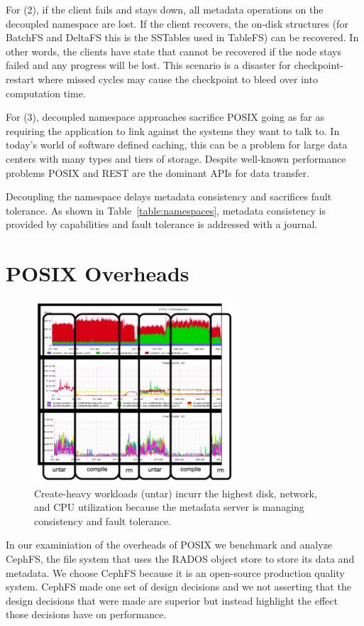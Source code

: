 \documentclass[preprint]{sigplanconf-eurosys}
\begin{document}
For (2), if the client fails and stays down, all metadata operations on the
decoupled namespace are lost. If the client recovers, the on-disk structures
(for BatchFS and DeltaFS this is the SSTables used in TableFS) can be
recovered. In other words, the clients have state that cannot be recovered if
the node stays failed and any progress will be lost. This scenario is a
disaster for checkpoint-restart where missed cycles may cause the checkpoint to
bleed over into computation time.

For (3), decoupled namespace approaches sacrifice POSIX going as far as
requiring the application to link against the systems they want to talk to. In
today's world of software defined caching, this can be a problem for large data
centers with many types and tiers of storage. Despite well-known performance
problems POSIX and REST are the dominant APIs for data transfer.

Decoupling the namespace delays metadata consistency and sacrifices fault
tolerance. As shown in Table~\ref{table:namespaces}, metadata consistency is
provided by capabilities and fault tolerance is addressed with a journal.

\section{POSIX Overheads}

\begin{figure}[tb]
\centering
\includegraphics[width=75mm]{figures/creates-motivation.png}
\caption{Create-heavy workloads (untar) incurr the highest disk, network, and CPU
utilization because the metadata server is managing consistency and fault
tolerance.}\label{fig:creates-motivation}
\end{figure}

In our examiniation of the overheads of POSIX we benchmark and analyze CephFS,
the file system that uses the RADOS object store to store its data and
metadata. We choose CephFS because it is an open-source production quality
system. CephFS made one set of design decisions and we not asserting that the
design decisions that were made are superior but instead highlight the
effect those decisions have on performance.
\end{document}
